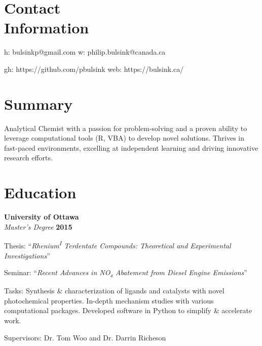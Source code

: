 \documentclass[margin,line]{resumecls}
\begin{document}
\thispagestyle{plain}
\begin{resume}

    \section{\mysidestyle Contact\\Information}

    h: bulsinkp@gmail.com \hfill w: philip.bulsink@canada.ca%
    \vspace{-4.5mm}

    gh: https://github.com/pbulsink \hfill web: https://bulsink.ca/%
    \\\vspace{-4.5mm}

    \section{\mysidestyle Summary}

    Analytical Chemist with a passion for problem-solving and a proven ability to leverage computational tools (R, VBA) to develop novel solutions.
    Thrives in fast-paced environments, excelling at independent learning and driving innovative research efforts.


    \section{\mysidestyle Education}

    \textbf{University of Ottawa}\\\vspace{1mm}%
    \textsl{Master's Degree} \hfill \textbf{2015}\vspace{-3mm}\\\vspace{-1mm}%
    \begin{list2}
        \item Thesis: ``\textit{Rhenium\textsuperscript{I} Terdentate Compounds: Theoretical and Experimental Investigations}''
        \item Seminar: ``\textit{Recent Advances in NO\textsubscript{x} Abatement from Diesel Engine Emissions}''
        \item Tasks: Synthesis \& characterization of ligands and catalysts with novel photochemical properties.
        In-depth mechanism studies with various computational packages.
        Developed software in Python to simplify \& accelerate work.
        \item Supervisors: Dr. Tom Woo and Dr. Darrin Richeson
    \end{list2}


\end{resume}
\end{document}
